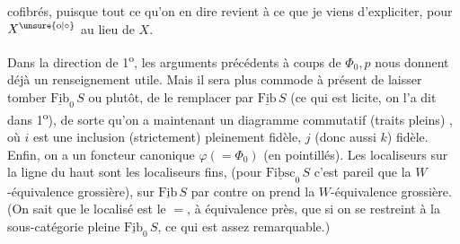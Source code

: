 cofibrés, puisque tout ce qu'on  en dire revient à ce que je viens d'expliciter, pour $X^{\unsure{\mathrm o|\circ}}$ au lieu de $X$.

Dans la direction de 1\textsuperscript{o}, les arguments précédents à coups de $\Phi_0,p$ nous donnent déjà un renseignement utile.
Mais il sera plus commode à présent de laisser tomber $\underline{\mathrm{Fib}}_0\,S$ ou plutôt, de le remplacer par $\underline{\mathrm{Fib}}\,S$ (ce qui est licite, on l'a dit dans 1\textsuperscript{o}), de sorte qu'on a maintenant un diagramme commutatif (traits pleins)
,
où $i$ est une inclusion (strictement) pleinement fidèle, $j$ (donc aussi $k$) fidèle. Enfin, on a un foncteur canonique $\varphi(=\Phi_0)$  (en pointillés). Les localiseurs sur la ligne du haut sont les localiseurs fins, (pour $\underline{\mathrm{Fibsc}}_0\,S$
c'est pareil que la $W$-équivalence grossière), sur $\underline{\mathrm{Fib}}\,S$ par contre on prend la $W$-équivalence grossière. (On sait que le localisé est le $=$, à équivalence près, que si on se restreint à la sous-catégorie pleine $\underline{\mathrm{Fib}}_0\,S$, ce qui est assez remarquable.)
